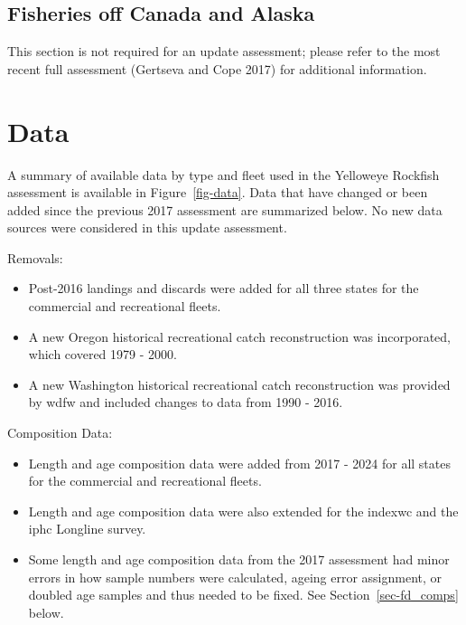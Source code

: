\documentclass[
]{scrartcl}
\providecommand{\tightlist}{%
  \setlength{\itemsep}{0pt}\setlength{\parskip}{0pt}}\usepackage{longtable,booktabs,array}
\begin{document}
\subsection{Fisheries off Canada and
Alaska}\label{fisheries-off-canada-and-alaska}

This section is not required for an update assessment; please refer to
the most recent full assessment (Gertseva and Cope 2017) for additional
information.

\newpage{}

\section{Data}\label{sec-data}

A summary of available data by type and fleet used in the Yelloweye
Rockfish assessment is available in Figure~\ref{fig-data}. Data that
have changed or been added since the previous 2017 assessment are
summarized below. No new data sources were considered in this update
assessment.

Removals:

\begin{itemize}
\tightlist
\item
  Post-2016 landings and discards were added for all three states for
  the commercial and recreational fleets.
\item
  A new Oregon historical recreational catch reconstruction was
  incorporated, which covered 1979 - 2000.
\item
  A new Washington historical recreational catch reconstruction was
  provided by \gls{wdfw} and included changes to data from 1990 - 2016.
\end{itemize}

Composition Data:

\begin{itemize}
\tightlist
\item
  Length and age composition data were added from 2017 - 2024 for all
  states for the commercial and recreational fleets.
\item
  Length and age composition data were also extended for the
  \gls{indexwc} and the \gls{iphc} Longline survey.
\item
  Some length and age composition data from the 2017 assessment had
  minor errors in how sample numbers were calculated, ageing error
  assignment, or doubled age samples and thus needed to be fixed. See
  Section~\ref{sec-fd_comps} below.
\end{itemize}
\end{document}
